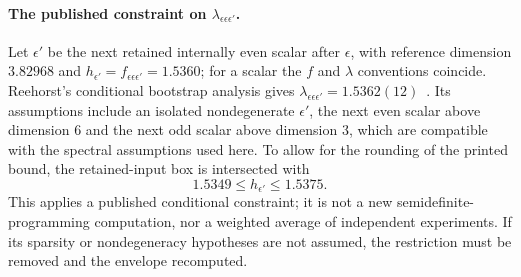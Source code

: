\documentclass[11pt,a4paper]{article}
\numberwithin{equation}{section}
\begin{document}
\paragraph{The published constraint on $\lambda_{\epsilon\epsilon\epsilon'}$.} Let $\epsilon'$ be the next retained
internally even scalar after $\epsilon$, with reference dimension $3.82968$ and $h_{\epsilon'}=f_{\epsilon\epsilon\epsilon'}=1.5360$;
for a scalar the $f$ and $\lambda$ conventions coincide. Reehorst's conditional bootstrap analysis gives
$\lambda_{\epsilon\epsilon\epsilon'}=1.5362(12)$~\cite{Reehorst:2021}. Its assumptions include an isolated
nondegenerate $\epsilon'$, the next even scalar above dimension 6 and the next odd scalar above dimension 3, which are
compatible with the spectral assumptions used here. To allow for the rounding of the printed bound, the retained-input
box is intersected with
\begin{equation}
 1.5349\le h_{\epsilon'}\le1.5375 .
 \label{eq:cone:reehorst}
\end{equation}
This applies a published conditional constraint; it is not a new semidefinite-programming computation, nor a weighted
average of independent experiments. If its sparsity or nondegeneracy hypotheses are not assumed, the restriction must
be removed and the envelope recomputed.
\end{document}
